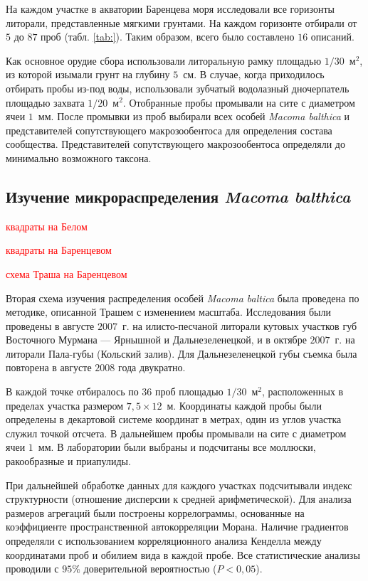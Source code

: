   На каждом участке в акватории Баренцева моря исследовали все  горизонты литорали, представленные мягкими грунтами.  
На каждом горизонте отбирали от $5$ до $87$ проб  (табл.  \ref{tab:}). Таким образом, всего было составлено $16$ описаний.

Как основное орудие сбора использовали литоральную рамку площадью $1/30$~м$^2$, из которой изымали грунт на глубину $5$~см. 
В случае, когда приходилось отбирать пробы из-под воды, использовали зубчатый водолазный дночерпатель площадью захвата $1/20$~м$^2$.
Отобранные пробы промывали на сите с диаметром ячеи $1$~мм. 
После промывки из   проб   выбирали   всех   особей  {\it Macoma   balthica}  и   представителей   сопутствующего макрозообентоса    для   определения   состава   сообщества.
   Представителей   сопутствующего макрозообентоса  определяли   до   минимально   возможного   таксона.



	\subsection{Изучение микрораспределения {\it Macoma balthica}}

\textcolor{red}{квадраты на Белом}

\textcolor{red}{квадраты на Баренцевом}

\textcolor{red}{схема Траша на Баренцевом}

Вторая схема изучения распределения особей {\it Macoma baltica} была проведена по методике, описанной Трашем \cite{Thrush_et_al_1989} с изменением масштаба.
Исследования были проведены в августе $2007$~г. на илисто-песчаной литорали кутовых участков губ Восточного Мурмана --- Ярнышной и Дальнезеленецкой, и в октябре $2007$~г. на литорали Пала-губы (Кольский залив). 
Для Дальнезеленецкой губы съемка была повторена в августе $2008$ года двукратно.

В каждой точке отбиралось по $36$ проб площадью $1/30$~м$^2$, расположенных в пределах участка размером $7,5 \times 12$~м. 
Координаты каждой пробы были определены в декартовой системе координат в метрах, один из углов участка служил точкой отсчета. 
В дальнейшем пробы промывали на сите с диаметром ячеи $1$~мм. 
В лаборатории были выбраны и  подсчитаны все моллюски, ракообразные и приапулиды.

При дальнейшей обработке данных для каждого участках подсчитывали индекс структурности (отношение дисперсии к средней арифметической). 
Для анализа размеров агрегаций были построены коррелограммы, основанные на коэффициенте пространственной автокорреляции Морана.
Наличие градиентов определяли с использованием корреляционного анализа Кенделла между координатами проб и обилием вида в каждой пробе. 
Все статистические анализы проводили с $95\%$ доверительной вероятностью ($P < 0,05$).


